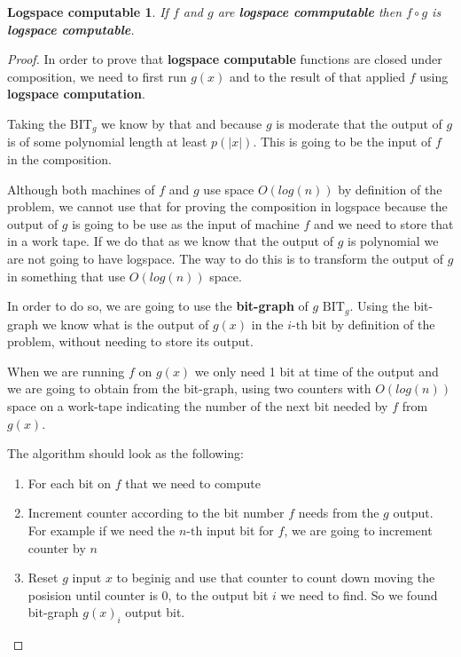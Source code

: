 \documentclass[12pt, a4paper]{article}
\begin{document}
\newtheorem{logspace}{Logspace computable}

\begin{logspace}
  If $f$ and $g$ are \textbf{logspace commputable} then $f \circ g$ is \textbf{logspace computable}.
\end{logspace}

\begin{proof} \label{proof:logspace}
    In order to prove that \textbf{logspace computable} functions are closed under composition, we need to first run $g(x)$ and to the result of that applied $f$ using \textbf{logspace computation}.

    Taking the $\text{BIT}_g$ we know by that and because $g$ is moderate that the output of $g$ is of some polynomial length at least $p(|x|)$. This is going to be the input of $f$ in the composition.

    Although both machines of $f$ and $g$ use space $O(log(n))$ by definition of the problem, we cannot use that for proving the composition in logspace because the output of $g$ is going to be use as the input of machine $f$ and we need to store that in a work tape. If we do that as we know that the output of $g$ is polynomial we are not going to have logspace. The way to do this is to transform the output of $g$ in something that use $O(log(n))$ space.

    In order to do so, we are going to use the \textbf{bit-graph} of $g$ $\text{BIT}_g$. Using the bit-graph we know what is the output of $g(x)$ in the $i\text{-th}$ bit by definition of the problem, without needing to store its output.

    When we are running $f$ on $g(x)$ we only need 1 bit at time of the output and we are going to obtain from the bit-graph, using two counters with $O(log(n))$ space on a work-tape indicating the number of the next bit needed by $f$ from $g(x)$.

    The algorithm should look as the following:

    \begin{enumerate}

      \item For each bit on $f$ that we need to compute

      \item Increment counter according to the bit number $f$ needs from the $g$ output. For example if we need the $n\text{-th}$ input bit for $f$, we are going to increment counter by $n$ \label{algo:1}

      \item Reset $g$ input $x$ to beginig and use that counter to count down moving the posision until counter is 0, to the output bit $i$ we need to find. So we found bit-graph $g(x)_{i}$ output bit. \label{algo:2}


\end{enumerate}
\end{proof}
\end{document}
